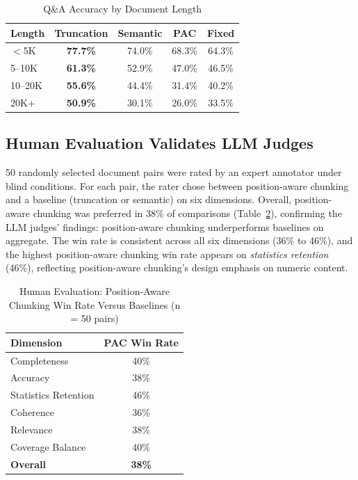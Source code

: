 \documentclass{ieeeaccess}
\begin{document}
\begin{table}[h]
\caption{Q\&A Accuracy by Document Length}
\label{tab:qa-length}
\centering
\footnotesize
\begin{tabular}{|l|c|c|c|c|}
\hline
\textbf{Length} & \textbf{Truncation} & \textbf{Semantic} & \textbf{PAC} & \textbf{Fixed} \\
\hline
$<$5K & \textbf{77.7\%} & 74.0\% & 68.3\% & 64.3\% \\
5--10K & \textbf{61.3\%} & 52.9\% & 47.0\% & 46.5\% \\
10--20K & \textbf{55.6\%} & 44.4\% & 31.4\% & 40.2\% \\
20K+ & \textbf{50.9\%} & 30.1\% & 26.0\% & 33.5\% \\
\hline
\end{tabular}
\end{table}

\subsection{Human Evaluation Validates LLM Judges}

50 randomly selected document pairs were rated by an expert annotator under blind conditions. For each pair, the rater chose between position-aware chunking and a baseline (truncation or semantic) on six dimensions. Overall, position-aware chunking was preferred in 38\% of comparisons (Table~\ref{tab:human}), confirming the LLM judges' findings: position-aware chunking underperforms baselines on aggregate. The win rate is consistent across all six dimensions (36\% to 46\%), and the highest position-aware chunking win rate appears on \emph{statistics retention} (46\%), reflecting position-aware chunking's design emphasis on numeric content.

\begin{table}[h]
\caption{Human Evaluation: Position-Aware Chunking Win Rate Versus Baselines (n = 50 pairs)}
\label{tab:human}
\centering
\begin{tabular}{|l|c|}
\hline
\textbf{Dimension} & \textbf{PAC Win Rate} \\
\hline
Completeness & 40\% \\
Accuracy & 38\% \\
Statistics Retention & 46\% \\
Coherence & 36\% \\
Relevance & 38\% \\
Coverage Balance & 40\% \\
\textbf{Overall} & \textbf{38\%} \\
\hline
\end{tabular}
\end{table}
\end{document}
